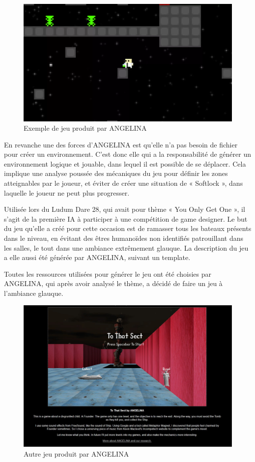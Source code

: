 \documentclass[a4paper, 12pt]{article} %
\begin{document}
\begin{figure}[!h]%
	\begin{center} 
		\includegraphics[width=0.60\columnwidth]{images/angelina.png}%
		\caption{Exemple de jeu produit par ANGELINA}%
	\end{center}
\end{figure}

En revanche une des forces d'ANGELINA est qu'elle n'a pas besoin de fichier pour créer un environnement. C'est donc elle qui a la responsabilité de générer un environnement logique et jouable, dans lequel il est possible de se déplacer. Cela implique une analyse poussée des mécaniques du jeu pour définir les zones atteignables par le joueur, et éviter de créer une situation de « Softlock », dans laquelle le joueur ne peut plus progresser.

\newpage
Utilisée lors du Ludum Dare 28, qui avait pour thème « You Only Get One », il s'agit de la première IA à participer à une compétition de game designer. Le but du jeu qu'elle a créé pour cette occasion est de ramasser tous les bateaux présents dans le niveau, en évitant des êtres humanoïdes non identifiés patrouillant dans les salles, le tout dans une ambiance extrêmement glauque. La description du jeu a elle aussi été générée par ANGELINA, suivant un template. 

Toutes les ressources utilisées pour générer le jeu ont été choisies par ANGELINA, qui après avoir analysé le thème, a décidé de faire un jeu à l'ambiance glauque.

\begin{figure}[!h]%
	\begin{center} 
		\includegraphics[width=1.0\columnwidth]{images/angelinacreepy.jpg}%
		\caption{Autre jeu produit par ANGELINA}%
	\end{center}
\end{figure}
\end{document}
